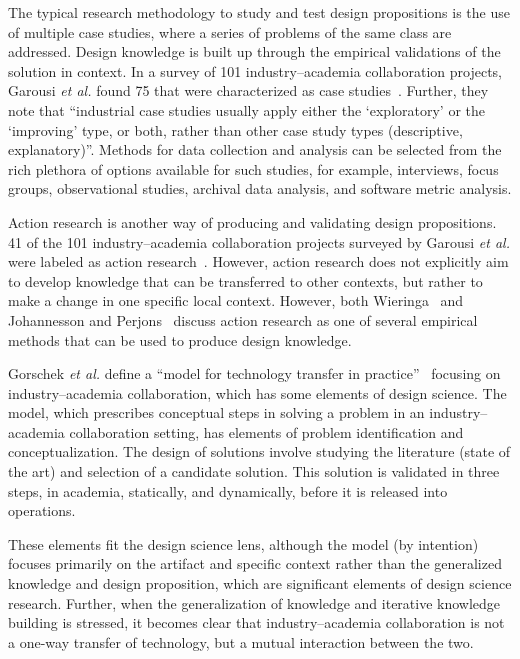 \documentclass[graybox]{svmult}
\begin{document}
The typical research methodology to study and test design propositions is the use of multiple case studies, where a series of problems of the same class are addressed. Design knowledge is built up through the empirical validations of the solution in context. 
In a survey of 101 industry--academia collaboration projects, Garousi \emph{et al.} found 75 that were characterized as case studies~\cite{Garousi2019}. Further, they note that ``industrial case studies usually apply either the `exploratory' or the `improving' type, or both, rather than other case study types (descriptive, explanatory)''. Methods for data collection and analysis can be selected from the rich plethora of options available for such studies, for example, interviews, focus groups, observational studies, archival data analysis, and software metric analysis. 


Action research is another way of producing and validating design propositions.  41 of the 101 industry--academia collaboration projects surveyed by Garousi \emph{et al.} were labeled as action research~\cite{Garousi2019}. However, action research does not explicitly aim to develop knowledge that can be transferred to other contexts, but rather to make a change in one specific local context. However, both Wieringa~\cite{wieringa_technical_2012} and Johannesson and Perjons~\cite{johannesson_introduction_2014} discuss action research as one of several empirical methods that can be used to produce design knowledge.


Gorschek \emph{et al.} define a ``model for technology transfer in practice''~\cite{GorschekSW2006} focusing on industry--academia collaboration, which has some elements of design science. The model, which prescribes conceptual steps in solving a problem in an industry--academia collaboration setting, has elements of problem identification and conceptualization. The design of solutions involve studying the literature (state of the art) and selection of a candidate solution. This solution is validated in three steps, in academia, statically, and dynamically, before it is released into operations. 

These elements fit the design science lens, although the model (by intention) focuses primarily on the artifact and specific context rather than the generalized knowledge and design proposition, which are significant elements of design science research. Further, when the generalization of knowledge and iterative knowledge building is stressed, it becomes clear that industry--academia collaboration is not a one-way transfer of technology, but a mutual interaction between the two.
\end{document}

